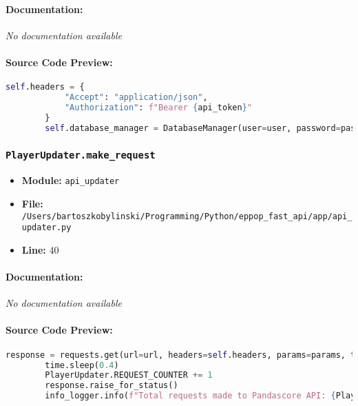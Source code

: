 \documentclass[11pt,a4paper]{article}
\begin{document}
\paragraph{Documentation:} \textit{No documentation available}

\paragraph{Source Code Preview:}
\begin{lstlisting}[language=Python]
        self.headers = {
            "Accept": "application/json",
            "Authorization": f"Bearer {api_token}"
        }
        self.database_manager = DatabaseManager(user=user, password=password, host=host, port=port, db_name=db_name)
\end{lstlisting}

\vspace{1em}
\subsubsection{\texttt{PlayerUpdater.make\_request}}

\begin{itemize}
    \item \textbf{Module:} \texttt{api\_updater}
    \item \textbf{File:} \texttt{/Users/bartoszkobylinski/Programming/Python/eppop\_fast\_api/app/api\_updater.py}
    \item \textbf{Line:} 40
\end{itemize}

\paragraph{Documentation:} \textit{No documentation available}

\paragraph{Source Code Preview:}
\begin{lstlisting}[language=Python]
        response = requests.get(url=url, headers=self.headers, params=params, timeout=10)
        time.sleep(0.4)
        PlayerUpdater.REQUEST_COUNTER += 1
        response.raise_for_status()
        info_logger.info(f"Total requests made to Pandascore API: {PlayerUpdater.REQUEST_COUNTER}. I've hit url: {url}")
\end{lstlisting}

\vspace{1em}
\end{document}
